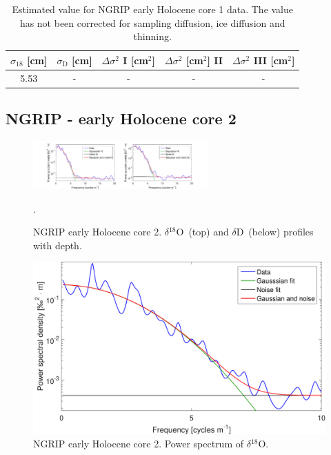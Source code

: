\documentclass[11pt, draftcls, onecolumn]{IEEEtran} %
\numberwithin{equation}{section}
\numberwithin{table}{section}
\numberwithin{figure}{section}
\newcommand{\delOx}{$\delta{}^{18}\mathrm{O}$}
\newcommand{\delD}{$\delta\mathrm{D}$}
\begin{document}
\begin{appendices}
\begin{table}[H]
	\center
	\caption{Estimated value for NGRIP early Holocene core 1 data.
		The value has not been corrected for sampling diffusion, ice diffusion and thinning.}
	\label{NGRIP_early1_holo}
	\begin{tabular}{c c c c c} 
		\toprule
		$\sigma_{18}$ [cm] & $\sigma_\mathrm{D}$ [cm] & $\Delta\sigma^2$ I [cm$^2$] & $\Delta\sigma^2$ [cm$^2$] II & $\Delta\sigma^2$ III [cm$^2$] \\
		\midrule
		5.53 &   - &    - &     - &     - \\
		\bottomrule		
	\end{tabular}
\end{table}

\clearpage

\subsection{NGRIP - early Holocene core 2}

\begin{figure}[H]
	\vspace*{2mm}
	\begin{center}
		\includegraphics[width=0.6\textwidth]{Figure_31}
		\caption{NGRIP early Holocene core 2. \delOx~(top) and \delD~(below) profiles with depth.}  \label{fig:NGRIP_early_2}.
	\end{center}
\end{figure}

\begin{figure}[H]
	\vspace*{2mm}
	\begin{center}
		\includegraphics[width=.5\textwidth]{Figure_32}
		\caption{NGRIP early Holocene core 2. Power spectrum of \delOx.}  \label{fig:NGRIP_early2}
	\end{center}
\end{figure}


\end{appendices}
\end{document}
